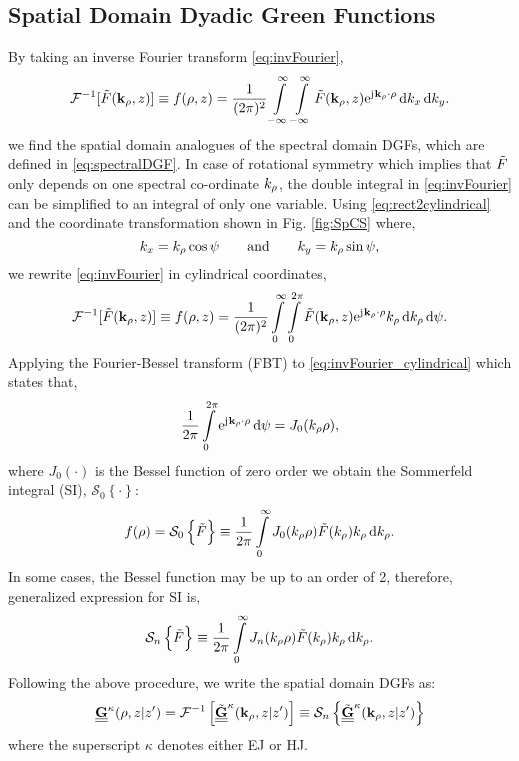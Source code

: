 \documentclass[12pt]{article}
\begin{document}
\subsection{Spatial Domain Dyadic Green Functions}
%
By taking an inverse Fourier transform \eqref{eq:invFourier},
%
\begin{equation}
  \mathcal{F}^{-1}[\tilde{F}(\mathbf{k}_{\rho},z)] \equiv f(\mathbf{\rho},z) = \frac{1}{(2 \pi )^2}\int\limits_{-\infty}^\infty \int\limits_{-\infty}^\infty
  \tilde{F}(\mathbf{k}_{\rho},z) \mathrm{e}^{\mathrm{j}\mkern1mu \mathbf{k}_{\rho} \cdot \mathbf{\rho}} \mathop{}\!\mathrm{d}{k_x} \mathop{}\!\mathrm{d}{k_y}.
  \label{eq:invFourier}
\end{equation}
%
we find the spatial domain analogues of the spectral domain DGFs, which are  defined in \eqref{eq:spectralDGF}. In case of rotational symmetry which implies that $\tilde{F}$ only depends on one spectral co-ordinate $k_{\rho}$, the double integral in \eqref{eq:invFourier} can be simplified to an integral of only one variable. Using  \eqref{eq:rect2cylindrical} and the coordinate transformation shown in Fig. \ref{fig:SpCS} where,
%
\begin{equation}
    k_x = k_{\p} \cos \psi \qquad \text{and} \qquad
    k_y = k_{\p} \sin \psi,
  \label{eq:cylindricaltransformation}%
\end{equation}
we rewrite \eqref{eq:invFourier} in cylindrical coordinates,
%
\begin{equation}
  \mathcal{F}^{-1} [\tilde{F}(\mathbf{k}_{\rho},z)] \equiv f(\mathbf{\rho},z) = \frac{1}{(2\pi)^2} \int\limits_0^{\infty} \int\limits_0^{2\pi}
  \tilde{F}(\mathbf{k}_{\rho},z) \mathrm{e}^{\mathrm{j}\mkern1mu \mathbf{k}_{\rho} \cdot \mathbf{\rho}} k_{\rho} \mathop{}\!\mathrm{d}{k_{\rho}} \mathop{}\!\mathrm{d}{\psi}.
  \label{eq:invFourier_cylindrical}
\end{equation}
%
Applying the Fourier-Bessel transform (FBT) to \eqref{eq:invFourier_cylindrical} which states that,
\begin{equation}
  \frac{1}{2\pi}\int\limits_0^{2\pi}
  \mathrm{e}^{\mathrm{j}\mkern1mu \mathbf{k}_{\rho} \cdot \mathbf{\rho}} \mathop{}\!\mathrm{d}{\psi} = J_0(k_{\rho}\rho),
  \label{eq:hankel_transofrm}
\end{equation}
%
where $J_0(\cdot)$ is the Bessel function of zero order
we obtain the Sommerfeld integral (SI), $\mathcal{S}_0\left \{\cdot\right \}$:
%
\begin{equation}
  f(\rho) = \mathcal{S}_0\left \{\tilde{F}\right \} \equiv \frac{1}{2\pi}\int\limits_0^{\infty} J_0(k_{\rho}\rho)  \tilde{F}(k_{\rho}) k_{\rho} \mathop{}\!\mathrm{d}{k_{\rho}}.
  \label{eq:sommerfeld_integral}
\end{equation}
%
In some cases, the Bessel function may be up to an order of 2, therefore, generalized expression for SI is,
%
\begin{equation}
    \mathcal{S}_n\left \{\ti{F}\right \} \equiv \frac{1}{2\pi}\int\limits_0^{\inf} J_n(k_{\p}\p)  \ti{F}(k_{\p}) k_{\p} \diff{k_{\p}}.
  \label{eq:generalized_SI}%
\end{equation}
%
Following the above procedure, we write the spatial domain DGFs as:
%
\begin{equation}
    {\tnsr{\v {G}}^\mathrm{\kappa}}(\v {\p}, z | z') = \mathcal{F}^{-1} \left[ \ti{\tnsr{\v {G}}}^\mathrm{\kappa}(\v k_{\p}, z | z') \right]
    \equiv \mathcal{S}_n\left \{\ti{\tnsr{\v {G}}}^\mathrm{\kappa}(\v k_{\p}, z | z')\right \}
  \label{eq:spatialDGF_generalized}%
\end{equation}
%
where the superscript $\kappa$ denotes either EJ or HJ.
\end{document}
